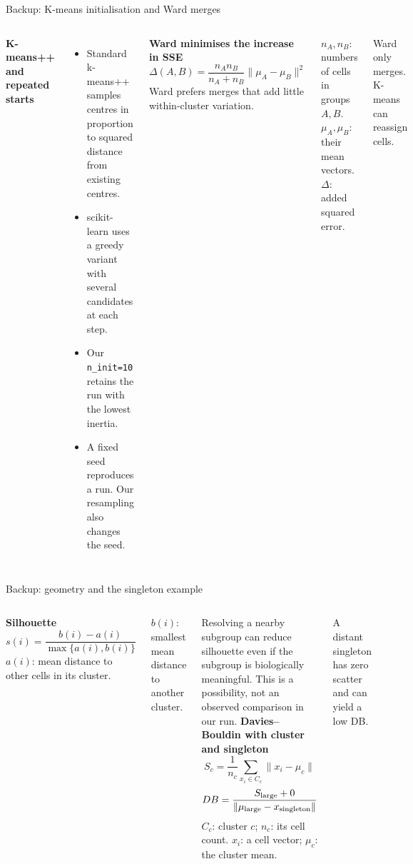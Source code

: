 \begin{frame}{Backup: K-means initialisation and Ward merges}
  \begin{columns}[T,onlytextwidth]
    \textbf{K-means++ and repeated starts}
    \small
    \begin{itemize}
      \item Standard k-means++ samples centres in proportion to squared distance from existing centres.
      \item scikit-learn uses a greedy variant with several candidates at each step.
      \item Our \texttt{n\_init=10} retains the run with the lowest inertia.
      \item A fixed seed reproduces a run. Our resampling also changes the seed.
    \end{itemize}
    \textbf{Ward minimises the increase in SSE}
    \[
      \Delta(A,B)=\frac{n_A n_B}{n_A+n_B}
      \lVert\mu_A-\mu_B\rVert^2
    \]
    \small Ward prefers merges that add little within-cluster variation.\par
    \vspace{3mm}
    $n_A,n_B$: numbers of cells in groups $A,B$. $\mu_A,\mu_B$: their mean vectors. $\Delta$: added squared error.\par\vspace{2mm} Ward only merges. K-means can reassign cells.
  \end{columns}
\end{frame}

\begin{frame}{Backup: geometry and the singleton example}
  \begin{columns}[T,onlytextwidth]
    \textbf{Silhouette}
    \[
      s(i)=\frac{b(i)-a(i)}{\max\{a(i),b(i)\}}
    \]
    \small $a(i)$: mean distance to other cells in its cluster.\par
    $b(i)$: smallest mean distance to another cluster.\par
    \vspace{2mm}
    Resolving a nearby subgroup can reduce silhouette even if the subgroup is biologically meaningful. This is a possibility, not an observed comparison in our run.
    \textbf{Davies--Bouldin with cluster and singleton}
    \[
      S_c=\frac{1}{n_c}\sum_{x_i\in C_c}\lVert x_i-\mu_c\rVert
    \]
    \[
      DB=\frac{S_{\rm large}+0}{\lVert\mu_{\rm large}-x_{\rm singleton}\rVert}
    \]
    \small $C_c$: cluster $c$; $n_c$: its cell count. $x_i$: a cell vector; $\mu_c$: the cluster mean.\par A distant singleton has zero scatter and can yield a low DB.
  \end{columns}
\end{frame}

